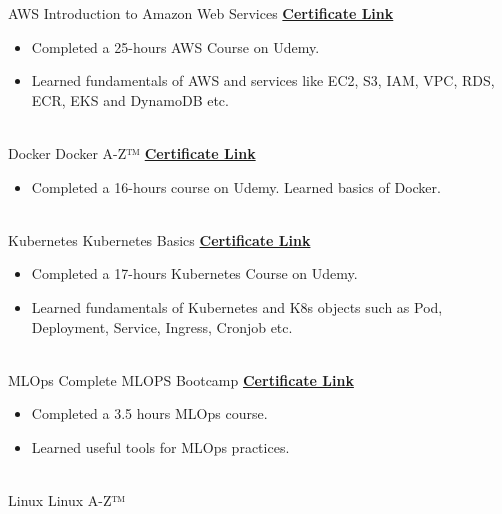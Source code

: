 \documentclass[letterpaper]{DS_class_file} %
\begin{document}
	\begin{twenty} %
			\twentyitem
		{AWS}
		{}
		{\hspace{0.3cm}Introduction to Amazon Web Services}
		{\href{https://www.udemy.com/certificate/UC-8773cc22-c86d-43a9-89ad-4c4e8e02aa38/}{\textbf{Certificate Link}}}
		{}
		{
			{\begin{itemize}
					\item Completed a 25-hours AWS Course on Udemy.
					\item Learned fundamentals of AWS and services like EC2, S3, IAM, VPC, RDS, ECR, EKS and DynamoDB etc.
			\end{itemize}}
		}
		\\
	
		\twentyitem
		{Docker}
		{}
		{\hspace{0.3cm}Docker A-Z™}
		{\href{https://www.udemy.com/certificate/UC-c1ab98de-9803-452b-9166-8ef3ae797e5a/}{\textbf{Certificate Link}}}
		{}
		{
			{\begin{itemize}
					\item Completed a 16-hours course on Udemy. Learned basics of Docker.
			\end{itemize}}
		}
			 \\
			\twentyitem
		{Kubernetes}
		{}
		{\hspace{0.3cm}Kubernetes Basics}
		{\href{https://www.udemy.com/certificate/UC-ffd4189d-0bd4-4cde-9845-bf7c5e5bbf22/}{\textbf{Certificate Link}}}
		{}
		{
			{\begin{itemize}
					\item Completed a 17-hours Kubernetes Course on Udemy.
						\item Learned fundamentals of Kubernetes and K8s objects such as Pod, Deployment, Service, Ingress, Cronjob etc.
			\end{itemize}}
		}
		\\
		\twentyitem
		{MLOps}
		{}
		{\hspace{0.3cm}Complete MLOPS Bootcamp}
		{\href{https://www.udemy.com/certificate/UC-2296034a-bb96-4d35-80b5-dd956cceeeb7/}{\textbf{Certificate Link}}}
		{}
		{
			{\begin{itemize}
					\item Completed a 3.5 hours MLOps course.
						\item Learned useful tools for MLOps practices.
			\end{itemize}}
		}
		\\
		\twentyitem
		{Linux}
		{}
		{\hspace{0.3cm}Linux A-Z™}

\end{twenty}
\end{document}
